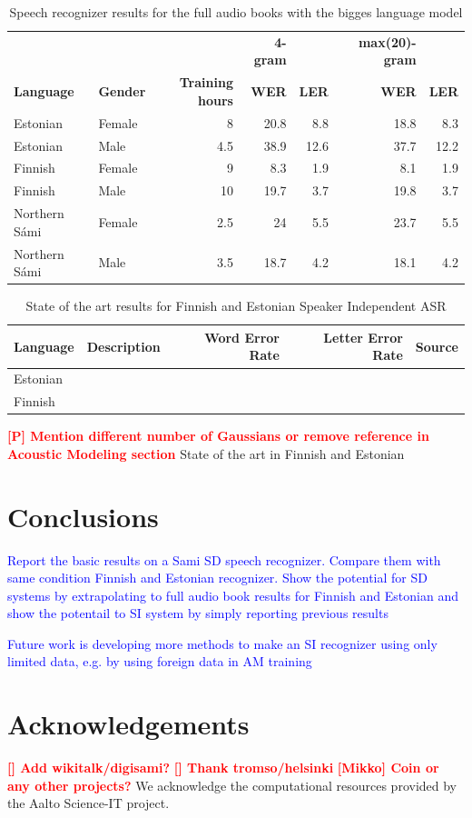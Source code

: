 \documentclass[b5paper]{article}
\newcommand{\todo}[2]{{\textcolor{red}{\bf [#1] #2 }}}
\newcommand{\note}[1]{{\textcolor{blue}{#1}}}
\newcommand{\ns}{{Northern Sámi }}
\begin{document}
\begin{table}[!h]
\centering
\begin{tabular}{llrrrrr}
& & & \textbf{4-gram} & & \textbf{max(20)-gram} &\\
\textbf{Language} & \textbf{Gender} & \textbf{Training hours} & \textbf{WER} & \textbf{LER}& \textbf{{WER}} & \textbf{LER}\\\hline
Estonian & Female & 8 & 20.8  & 8.8 & 18.8 & 8.3  \\
Estonian & Male & 4.5 & 38.9  & 12.6   & 37.7  & 12.2 \\
Finnish & Female & 9  & 8.3 & 1.9  & 8.1 &  1.9\\
Finnish & Male & 10  & 19.7 & 3.7  & 19.8  & 3.7  \\
\ns & Female & 2.5  & 24 & 5.5  & 23.7  & 5.5 \\
\ns & Male & 3.5  & 18.7 & 4.2  & 18.1  & 4.2 \\
\end{tabular}
\caption{Speech recognizer results for the full audio books with the bigges language model \label{tbl:resultbigcomp}}
\end{table}



\begin{table}[!h]
\centering
\begin{tabular}{llrrl}
\textbf{Language} & \textbf{Description} & \textbf{Word Error Rate} & \textbf{Letter Error Rate} & \textbf{Source}\\\hline
Estonian &  & & &  \\
Finnish &  & & &  \\
\end{tabular}
\caption{State of the art results for Finnish and Estonian Speaker Independent ASR}
\end{table}


\todo{P}{Mention different number of Gaussians or remove reference in Acoustic Modeling section}
State of the art in Finnish \cite{hirsimaki2006unlimited} and Estonian \cite{kurimo2015modeling}


\section{Conclusions} 
\note{Report the basic results on a Sami SD speech recognizer. Compare them with same condition Finnish and Estonian recognizer. Show the potential for SD systems by extrapolating to full audio book results for Finnish and Estonian and show the potentail to SI system by simply reporting previous results}

\note{Future work is developing more methods to make an SI recognizer using only limited data, e.g. by using foreign data in AM training}

\section{Acknowledgements} 
\todo{}{Add wikitalk/digisami?} \todo{}{Thank tromso/helsinki} \todo{Mikko}{Coin or any other projects?}
We acknowledge the computational resources provided by the Aalto Science-IT project.




 
\end{document}
